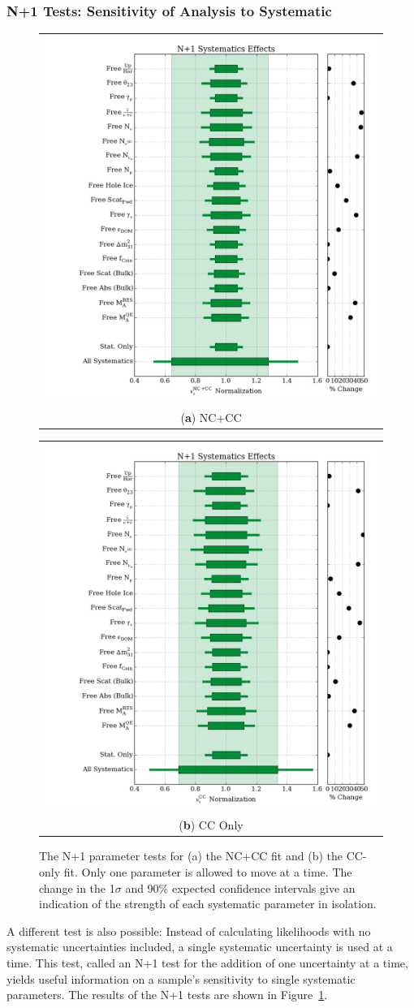 \subsubsection{N+1 Tests: Sensitivity of Analysis to Systematic}
\begin{figure}[h]
\centering
\begin{tabular}[b]{c}
  \includegraphics[width=0.45\linewidth]{n+1_widths_nc_cc.png} \\
  \small (\textbf{\color{ctcolormain}a}) NC+CC
\end{tabular} \hspace{2pt}
\begin{tabular}[b]{c}
  \includegraphics[width=0.45\linewidth]{n+1_widths_cc.png} \\
  \small (\textbf{\color{ctcolormain}b}) CC Only
\end{tabular}
\caption[The N+1 parameter tests]{The N+1 parameter tests for (a) the NC+CC fit and (b) the CC-only fit. Only one parameter is allowed to move at a time. The change in the 1$\sigma$ and 90\% expected confidence intervals give an indication of the strength of each systematic parameter in isolation.}
\label{fig:n+1_tests}
\end{figure}

A different test is also possible: Instead of calculating likelihoods with no systematic uncertainties included, a single systematic uncertainty is used at a time.
This test, called an N+1 test for the addition of one uncertainty at a time, yields useful information on a sample's sensitivity to single systematic parameters.
The results of the N+1 tests are shown in Figure~\ref{fig:n+1_tests}.


